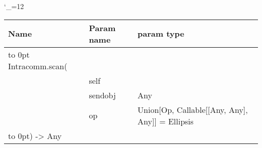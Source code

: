 \begingroup \catcode`\_=12 \tt
\begin{tabular}{lll}
\toprule
\textrm{Name}&\textrm{Param name}&\textrm{param type}\\
\midrule
\hbox to 0pt {Intracomm.scan(\hss}\\
& self\\
& sendobj & Any\\
& op & Union[Op, Callable[[Any, Any], Any]] = Ellipsis\\
\hbox to 0pt{) -> Any\hss}\\
\bottomrule
\end{tabular}
\endgroup
